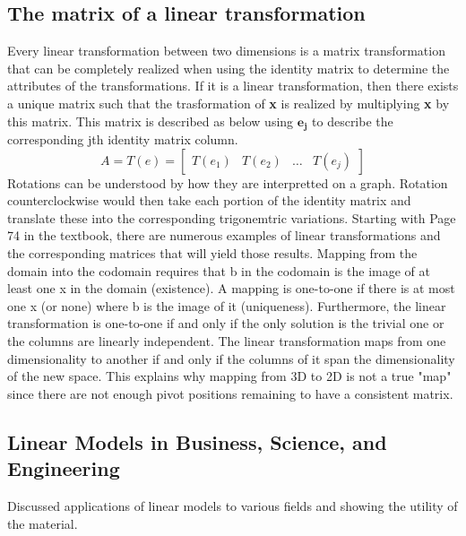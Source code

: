 \documentclass[12pt]{article}
\begin{document}
\subsection{The matrix of a linear transformation}
Every linear transformation between two dimensions is a matrix transformation that can be completely realized when using the identity matrix to determine the attributes of the %
transformations. If it is a linear transformation, then there exists a unique matrix such that the trasformation of \textbf{x} is realized by multiplying \textbf{x} by this %
matrix. This matrix is described as below using $\mathbf{e_j}$ to describe the corresponding jth identity matrix column. 
\begin{equation}
    A = T(e) = \begin{bmatrix}
        T(e_1) & T(e_2) & \dots & T(e_j)
    \end{bmatrix}
\end{equation}
Rotations can be understood by how they are interpretted on a graph. Rotation counterclockwise would then take each portion of the identity matrix and translate these into the %
corresponding trigonemtric variations. Starting with Page 74 in the textbook, there are numerous examples of linear transformations and the corresponding matrices that will %
yield those results. Mapping from the domain into the codomain requires that b in the codomain is the image of at least one x in the domain (existence). A mapping is one-to-one %
if there is at most one x (or none) where b is the image of it (uniqueness). Furthermore, the linear transformation is one-to-one if and only if the only solution is the %
trivial one or the columns are linearly independent. The linear transformation maps from one dimensionality to another if and only if the columns of it span the %
dimensionality of the new space. This explains why mapping from 3D to 2D is not a true "map" since there are not enough pivot positions remaining to have a consistent matrix. 
\newline
\newline
\subsection{Linear Models in Business, Science, and Engineering}
Discussed applications of linear models to various fields and showing the utility of the material. 
\end{document}
